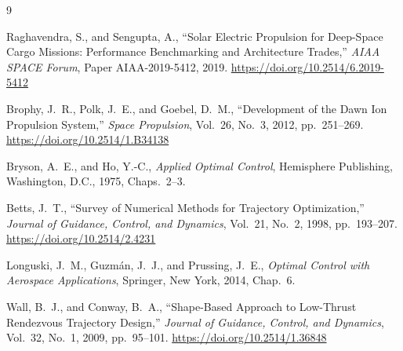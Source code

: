 \documentclass{aiaa-tc}
\begin{document}
\begin{thebibliography}{9}

Raghavendra, S., and Sengupta, A.,
``Solar Electric Propulsion for Deep-Space Cargo Missions: Performance
  Benchmarking and Architecture Trades,''
\textit{AIAA SPACE Forum}, Paper AIAA-2019-5412, 2019.
\url{https://doi.org/10.2514/6.2019-5412}

Brophy, J.~R., Polk, J.~E., and Goebel, D.~M.,
``Development of the Dawn Ion Propulsion System,''
\textit{Space Propulsion},
Vol.~26, No.~3, 2012, pp.~251–269.
\url{https://doi.org/10.2514/1.B34138}

Bryson, A.~E., and Ho, Y.-C.,
\textit{Applied Optimal Control},
Hemisphere Publishing, Washington, D.C., 1975, Chaps.~2–3.

Betts, J.~T.,
``Survey of Numerical Methods for Trajectory Optimization,''
\textit{Journal of Guidance, Control, and Dynamics},
Vol.~21, No.~2, 1998, pp.~193–207.
\url{https://doi.org/10.2514/2.4231}

Longuski, J.~M., Guzm\'{a}n, J.~J., and Prussing, J.~E.,
\textit{Optimal Control with Aerospace Applications},
Springer, New York, 2014, Chap.~6.

Wall, B.~J., and Conway, B.~A.,
``Shape-Based Approach to Low-Thrust Rendezvous Trajectory Design,''
\textit{Journal of Guidance, Control, and Dynamics},
Vol.~32, No.~1, 2009, pp.~95–101.
\url{https://doi.org/10.2514/1.36848}

\end{thebibliography}
\end{document}
